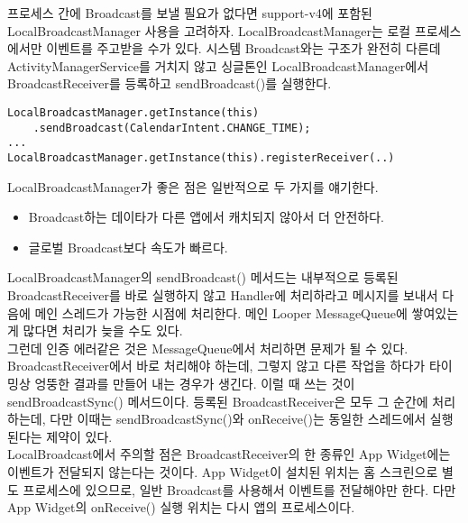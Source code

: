 프로세스 간에 Broadcast를 보낼 필요가 없다면 support-v4에 포함된 LocalBroadcastManager 사용을 고려하자. 
LocalBroadcastManager는 로컬 프로세스에서만 이벤트를 주고받을 수가 있다.
시스템 Broadcast와는 구조가 완전히 다른데 ActivityManagerService를 거치지 않고 싱글톤인 LocalBroadcastManager에서 BroadcastReceiver를 등록하고 sendBroadcast()를 실행한다.

\begin{lstlisting}[frame=single] 
LocalBroadcastManager.getInstance(this)
	.sendBroadcast(CalendarIntent.CHANGE_TIME);
...
LocalBroadcastManager.getInstance(this).registerReceiver(..)
\end{lstlisting}

LocalBroadcastManager가 좋은 점은 일반적으로 두 가지를 얘기한다.
\begin{itemize}
\item Broadcast하는 데이타가 다른 앱에서 캐치되지 않아서 더 안전하다.
\item 글로벌 Broadcast보다 속도가 빠르다.
\end{itemize}

LocalBroadcastManager의 sendBroadcast() 메서드는 내부적으로 등록된 BroadcastReceiver를 바로 실행하지 않고 Handler에 처리하라고 메시지를 보내서 다음에 메인 스레드가 가능한 시점에 처리한다. 메인 Looper MessageQueue에 쌓여있는 게 많다면 처리가 늦을 수도 있다.\\

그런데 인증 에러같은 것은 MessageQueue에서 처리하면 문제가 될 수 있다.
BroadcastReceiver에서 바로 처리해야 하는데, 그렇지 않고 다른 작업을 하다가 타이밍상 엉뚱한 결과를 만들어 내는 경우가 생긴다. 
이럴 때 쓰는 것이 sendBroadcastSync() 메서드이다. 
등록된 BroadcastReceiver은 모두 그 순간에 처리하는데, 다만 이때는 sendBroadcastSync()와 onReceive()는 동일한 스레드에서 실행된다는 제약이 있다.\\

LocalBroadcast에서 주의할 점은 BroadcastReceiver의 한 종류인 App Widget에는 이벤트가 전달되지 않는다는 것이다. App Widget이 설치된 위치는 홈 스크린으로 별도 프로세스에 있으므로, 일반 Broadcast를 사용해서 이벤트를 전달해야만 한다. 다만 App Widget의 onReceive() 실행 위치는 다시 앱의 프로세스이다.

\begin{comment}
별도 스레드내에서 sendBroadcastSync를 할 수 밖에 없다고 하면 onReceive 안에다가 UI를 건드리는 쪽에는 runOnUIThread 해도 되지만 참 번거로운 일이 되네요.

Activity의 runOnUIThread는 호출하는 곳이 uiThread가 아니면 역시 post를 해주고 있어요.
runOnUIThread는 해결책이라고 볼 수가 없네요.

\end{comment}

